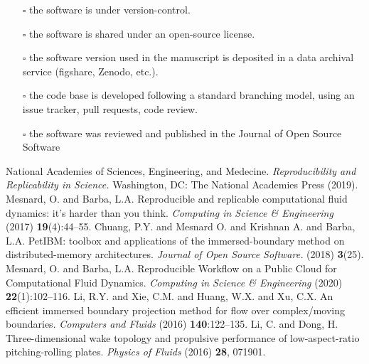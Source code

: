 \documentclass{parcfd}
\begin{document}
\begin{small}
\begin{itemize}[noitemsep]
    \item[$\square$] the software is under version-control.
    \item[$\square$] the software is shared under an open-source license.
    \item[$\square$] the software version used in the manuscript is deposited in a data archival service (figshare, Zenodo, etc.).
    \item[$\square$] the code base is developed following a standard branching model, using an issue tracker, pull requests, code review.
    \item[$\square$] the software was reviewed and published in the Journal of Open Source Software
\end{itemize}
\end{small}

\begin{thebibliography}{99}
     {National Academies of Sciences, Engineering, and Medecine.} \textit{Reproducibility and Replicability in Science.} Washington, DC: The National Academies Press (2019).
     Mesnard, O. and Barba, L.A. Reproducible and replicable computational fluid dynamics: it's harder than you think. \textit{Computing in Science \& Engineering} (2017) \textbf{19}(4):44--55.
     Chuang, P.Y. and Mesnard O. and Krishnan A. and Barba, L.A. PetIBM: toolbox and applications of the immersed-boundary method on distributed-memory architectures. \textit{Journal of Open Source Software.} (2018) \textbf{3}(25).
     Mesnard, O. and Barba, L.A. Reproducible Workflow on a Public Cloud for Computational Fluid Dynamics. \textit{Computing in Science \& Engineering} (2020) \textbf{22}(1):102--116.
     Li, R.Y. and Xie, C.M. and Huang, W.X. and Xu, C.X. An efficient immersed boundary projection method for flow over complex/moving boundaries. \textit{Computers and Fluids} (2016) \textbf{140}:122--135.
     Li, C. and Dong, H. Three-dimensional wake topology and propulsive performance of low-aspect-ratio pitching-rolling plates. \textit{Physics of Fluids} (2016) \textbf{28}, 071901.
\end{thebibliography}
\end{document}
